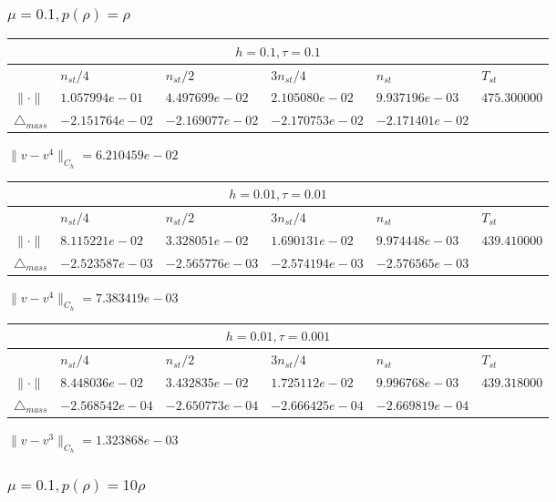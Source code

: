 \subsubsection{$\mu = 0.1, p(\rho) = \rho $}
\begin{tabular}{*{6}{|l}|}
    \hline
     \\
    \hline
    &$n_{st}/4 $&$ n_{st}/2$&$3n_{st}/4$&$n_{st}$&$T_{st}$ \\
    \hline
    $\|\cdot \|$& $1.057994e-01$ & $4.497699e-02$ & $2.105080e-02$ & $9.937196e-03$ &$475.300000$\\
\hline
$\triangle_{mass}$& $-2.151764e-02$ & $-2.169077e-02$ & $-2.170753e-02$ & $-2.171401e-02$ &\\
\hline
\end{tabular}

$\|v-v^{4}\|_{C_h} = 6.210459e-02$


\begin{tabular}{*{6}{|l}|}
    \hline
     \\
    \hline
    &$n_{st}/4 $&$ n_{st}/2$&$3n_{st}/4$&$n_{st}$&$T_{st}$ \\
    \hline
    $\|\cdot \|$& $8.115221e-02$ & $3.328051e-02$ & $1.690131e-02$ & $9.974448e-03$ &$439.410000$\\
\hline
$\triangle_{mass}$& $-2.523587e-03$ & $-2.565776e-03$ & $-2.574194e-03$ & $-2.576565e-03$ &\\
\hline
\end{tabular}

$\|v-v^{4}\|_{C_h} = 7.383419e-03$

\begin{tabular}{*{6}{|l}|}
    \hline
     \\
    \hline
    &$n_{st}/4 $&$ n_{st}/2$&$3n_{st}/4$&$n_{st}$&$T_{st}$ \\
    \hline
    $\|\cdot \|$& $8.448036e-02$ & $3.432835e-02$ & $1.725112e-02$ & $9.996768e-03$ &$439.318000$\\
\hline
$\triangle_{mass}$& $-2.568542e-04$ & $-2.650773e-04$ & $-2.666425e-04$ & $-2.669819e-04$ &\\
\hline
\end{tabular}

$\|v-v^{3}\|_{C_h} = 1.323868e-03$

\subsubsection{$\mu = 0.1, p(\rho) = 10\rho $}


